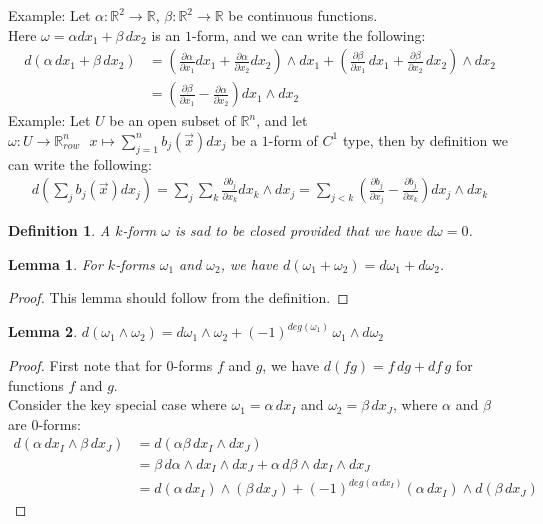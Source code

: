 \documentclass[11pt,oneside]{book}
\theoremstyle{break}
\theoremstyle{break}
\newtheorem{lem}{Lemma}[thm]
\newtheorem{defn}{Definition}[corL]
\newcommand{\R}{\mathbb{R}}
\newcommand{\pd}{\partial}
\newcommand{\lr}[1]{\left(#1\right)}
\newcommand{\example}{\color{green}Example: \color{black}}
\begin{document}
\example
Let $\alpha:\R^2 \to \R$, $\beta:\R^2 \to \R$ be continuous functions.\\ 
Here $\omega = \alpha dx_1 + \beta \, dx_2$ is an $1$-form, and we can write the following:
\begin{align*}
d\left(\alpha\, dx_1+ \beta \, dx_2\right) &= \left(\frac{\partial \alpha}{\partial x_1}dx_1 + \frac{\partial \alpha}{\partial x_2}dx_2 \right)\wedge dx_1 + \left(\frac{\partial \beta}{\partial x_1}\, dx_1 + \frac{\partial \beta}{\partial x_2}\, dx_2 \right)\wedge dx_2 \\
&= \left( \frac{\partial \beta}{\partial x_1} - \frac{\partial \alpha}{\partial x_2}\right) dx_1\wedge dx_2
\end{align*}
\example Let $U$ be an open subset of $\R^n$, and let $\omega:U \to \R^n_{row} \ \ \ x\mapsto \sum_{j=1}^n b_j(\vec{x}) dx_j$ be a $1$-form of $C^1$ type, then by definition we can write the following:
\begin{align*}
d\lr{\sum_j b_j(\vec{x}) dx_j} = \sum_j \sum_k \frac{\pd b_j}{\pd x_k}dx_k \wedge dx_j = \sum_{j<k}\lr{\frac{\pd b_j}{\pd x_j} - \frac{\pd b_j}{\pd x_k}} dx_j \wedge dx_k
\end{align*}

\begin{defn}
A $k$-form $\omega$ is sad to be closed provided that we have $d\omega = 0$.
\end{defn}

\begin{lem}
For $k$-forms $\omega_1$ and $\omega_2$, we have $d(\omega_1 + \omega_2) = d\omega_1 + d\omega_2$.
\end{lem}
\begin{proof}
This lemma should follow from the definition.
\end{proof}

\begin{lem}
$d(\omega_1 \wedge \omega_2) = d\omega_1 \wedge \omega_2 +(-1)^{deg(\omega_1)}\, \omega_1\wedge d\omega_2$
\end{lem}
\begin{proof}
First note that for $0$-forms $f$ and $g$, we have $d(fg) = f\, dg+ df\, g$ for functions $f$ and $g$. \\
Consider the key special case where $\omega_1 = \alpha\, dx_I$ and $\omega_2 = \beta\, dx_J$, where $\alpha$ and $\beta$ are $0$-forms:
\begin{align*}
d(\alpha\, dx_I \wedge \beta\, dx_J) &= d(\alpha\beta \, dx_I \wedge dx_J)  \\
&=  \beta \, d\alpha \wedge dx_I \wedge dx_J + \alpha\, d\beta \wedge dx_I \wedge dx_J \\
&= d(\alpha\, dx_I) \wedge (\beta\, dx_J) + (-1)^{deg(\alpha \, dx_I)} ( \alpha \, dx_I)\wedge d(\beta\, dx_J) 
\end{align*}
\end{proof} 
\end{document}
